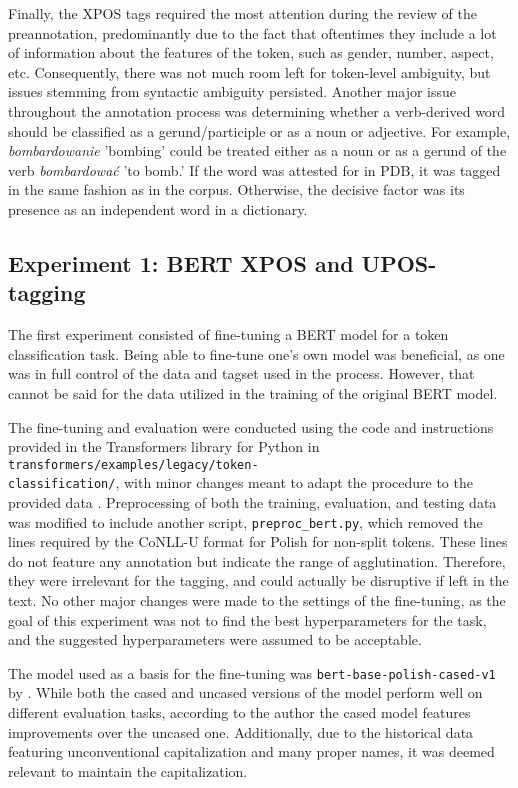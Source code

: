Finally, the XPOS tags required the most attention during the review of the preannotation, predominantly due to the fact that oftentimes they include a lot of information about the features of the token, such as gender, number, aspect, etc. Consequently, there was not much room left for token-level ambiguity, but issues stemming from syntactic ambiguity persisted. Another major issue throughout the annotation process was determining whether a verb-derived word should be classified as a gerund/participle or as a noun or adjective. For example, \textit{bombardowanie} 'bombing' could be treated either as a noun or as a gerund of the verb \textit{bombardować} 'to bomb.' If the word was attested for in PDB, it was tagged in the same fashion as in the corpus. Otherwise, the decisive factor was its presence as an independent word in a dictionary.  

\subsection{Experiment 1: BERT XPOS and UPOS-tagging}
\label{subsec:bert-tagging}

The first experiment consisted of fine-tuning a BERT model for a token classification task. Being able to fine-tune one's own model was beneficial, as one was in full control of the data and tagset used in the process. However, that cannot be said for the data utilized in the training of the original BERT model. 

The fine-tuning and evaluation were conducted using the code and instructions provided in the Transformers library for Python in \texttt{transformers/examples/legacy/token-\\classification/}, with minor changes meant to adapt the procedure to the provided data  \citep{wolf-etal-2020-transformers}. Preprocessing of both the training, evaluation, and testing data was modified to include another script, \texttt{preproc\_bert.py}, which removed the lines required by the CoNLL-U format for Polish for non-split tokens. These lines do not feature any annotation but indicate the range of agglutination. Therefore, they were irrelevant for the tagging, and could actually be disruptive if left in the text. No other major changes were made to the settings of the fine-tuning, as the goal of this experiment was not to find the best hyperparameters for the task, and the suggested hyperparameters were assumed to be acceptable.

The model used as a basis for the fine-tuning was \texttt{bert-base-polish-cased-v1} by \citet{kłeczek_2021}. While both the cased and uncased versions of the model perform well on different evaluation tasks, according to the author the cased model features improvements over the uncased one. Additionally, due to the historical data featuring unconventional capitalization and many proper names, it was deemed relevant to maintain the capitalization.

